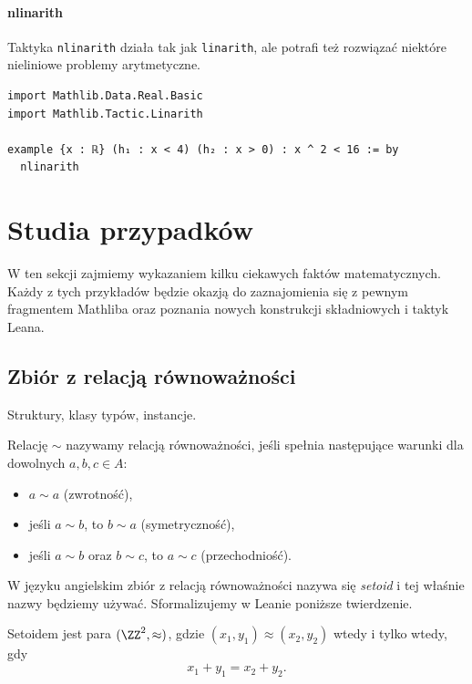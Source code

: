 \documentclass[polish,pretty,bibliography=totocnumbered]{angav}
\newcommand{\Lean}[1]{\texttt{#1}}
\begin{document}
\paragraph{nlinarith}
Taktyka \Lean{nlinarith} działa tak jak \Lean{linarith}, ale potrafi też rozwiązać niektóre nieliniowe problemy arytmetyczne.
\begin{verbatim}
import Mathlib.Data.Real.Basic
import Mathlib.Tactic.Linarith

example {x : ℝ} (h₁ : x < 4) (h₂ : x > 0) : x ^ 2 < 16 := by
  nlinarith
\end{verbatim}

\section{Studia przypadków}

W ten sekcji zajmiemy wykazaniem kilku ciekawych faktów matematycznych.
Każdy z tych przykładów będzie okazją do zaznajomienia się z pewnym fragmentem Mathliba oraz poznania nowych konstrukcji składniowych i taktyk Leana.

\subsection{Zbiór z relacją równoważności}

\begin{lesson-goals}
    Struktury, klasy typów, instancje.
\end{lesson-goals}

\begin{definition}
    Relację $\sim$ nazywamy relacją równoważności, jeśli spełnia następujące warunki dla dowolnych $a, b, c \in A$:
    \begin{itemize}[nosep]
        \item $a \sim a$ (zwrotność),
        \item jeśli $a \sim b$, to $b \sim a$ (symetryczność),
        \item jeśli $a \sim b$ oraz $b \sim c$, to $a \sim c$ (przechodniość).
    \end{itemize}
\end{definition}

W języku angielskim zbiór z relacją równoważności nazywa się \textit{setoid} i tej właśnie nazwy będziemy używać.
Sformalizujemy w Leanie poniższe twierdzenie.

\begin{theorem}
    Setoidem jest para $(\ZZ^2, \approx)$, gdzie $(x_1, y_1) \approx (x_2, y_2)$ wtedy i tylko wtedy, gdy
    \[ x_1 + y_1 = x_2 + y_2. \]
\end{theorem}
\end{document}

